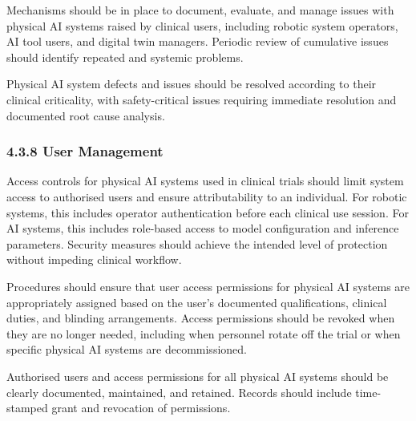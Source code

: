 \begin{description}[leftmargin=2.5cm,style=sameline]

\item[(a)] Mechanisms should be in place to document, evaluate, and manage issues with physical AI systems raised by clinical users, including robotic system operators, AI tool users, and digital twin managers. Periodic review of cumulative issues should identify repeated and systemic problems.

\item[(b)] Physical AI system defects and issues should be resolved according to their clinical criticality, with safety-critical issues requiring immediate resolution and documented root cause analysis.

\end{description}

\subsubsection{4.3.8 User Management}

\begin{description}[leftmargin=2.5cm,style=sameline]

\item[(a)] Access controls for physical AI systems used in clinical trials should limit system access to authorised users and ensure attributability to an individual. For robotic systems, this includes operator authentication before each clinical use session. For AI systems, this includes role-based access to model configuration and inference parameters. Security measures should achieve the intended level of protection without impeding clinical workflow.

\item[(b)] Procedures should ensure that user access permissions for physical AI systems are appropriately assigned based on the user's documented qualifications, clinical duties, and blinding arrangements. Access permissions should be revoked when they are no longer needed, including when personnel rotate off the trial or when specific physical AI systems are decommissioned.

\item[(c)] Authorised users and access permissions for all physical AI systems should be clearly documented, maintained, and retained. Records should include time-stamped grant and revocation of permissions.

\end{description}

